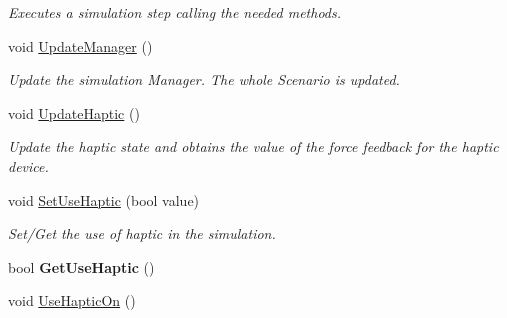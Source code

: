 \begin{DoxyCompactItemize}
\begin{DoxyCompactList}\small\item\em Executes a simulation step calling the needed methods. \item\end{DoxyCompactList}\item 
\hypertarget{classvtkSimulation_a5e937f6a563eb3c6334489ed2170992d}{
void \hyperlink{classvtkSimulation_a5e937f6a563eb3c6334489ed2170992d}{UpdateManager} ()}
\label{classvtkSimulation_a5e937f6a563eb3c6334489ed2170992d}

\begin{DoxyCompactList}\small\item\em Update the simulation Manager. The whole Scenario is updated. \item\end{DoxyCompactList}\item 
\hypertarget{classvtkSimulation_ad06d10364d93a8c7743129232de29133}{
void \hyperlink{classvtkSimulation_ad06d10364d93a8c7743129232de29133}{UpdateHaptic} ()}
\label{classvtkSimulation_ad06d10364d93a8c7743129232de29133}

\begin{DoxyCompactList}\small\item\em Update the haptic state and obtains the value of the force feedback for the haptic device. \item\end{DoxyCompactList}\item 
\hypertarget{classvtkSimulation_a243777646629d5364d15c52ae1d7d146}{
void \hyperlink{classvtkSimulation_a243777646629d5364d15c52ae1d7d146}{SetUseHaptic} (bool value)}
\label{classvtkSimulation_a243777646629d5364d15c52ae1d7d146}

\begin{DoxyCompactList}\small\item\em Set/Get the use of haptic in the simulation. \item\end{DoxyCompactList}\item 
\hypertarget{classvtkSimulation_a0042f7aa2f36725f2e3acd9d81f491a4}{
bool {\bfseries GetUseHaptic} ()}
\label{classvtkSimulation_a0042f7aa2f36725f2e3acd9d81f491a4}

\item 
\hypertarget{classvtkSimulation_a52411abfc00f3220b23a7a16edc18c38}{
void \hyperlink{classvtkSimulation_a52411abfc00f3220b23a7a16edc18c38}{UseHapticOn} ()}
\label{classvtkSimulation_a52411abfc00f3220b23a7a16edc18c38}


\end{DoxyCompactItemize}
